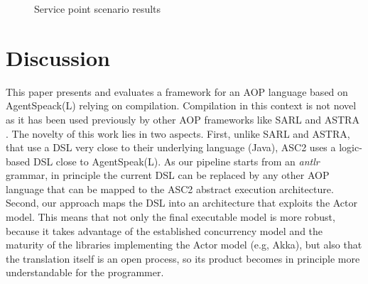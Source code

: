 \begin{figure}[bt!]
\caption{Service point scenario results}
\label{fig:ping_pong1}
\end{figure}

\section{Discussion}
\label{sec:discussion}
This paper presents and evaluates a framework for an AOP language based on AgentSpeack(L) relying on compilation. Compilation in this context is not novel as it has been used previously by other AOP frameworks like SARL \cite{Sarl} and ASTRA \cite{Astra}. The novelty of this work lies in two aspects. First, unlike SARL and ASTRA, that use a DSL very close to their underlying language (Java), ASC2 uses a logic-based DSL close to AgentSpeak(L). %
As our pipeline starts from an \textit{antlr} grammar, in principle 
the current DSL can be replaced by any other AOP language that can be mapped to the ASC2 abstract execution architecture. Second, our approach maps the DSL into an architecture that exploits the Actor model. This means that not only the final executable model is more robust, because it takes advantage of the established concurrency model and the maturity of the libraries implementing the Actor model (e.g, Akka), but also that the translation itself is an open process, so its product becomes in principle more understandable for the programmer.


